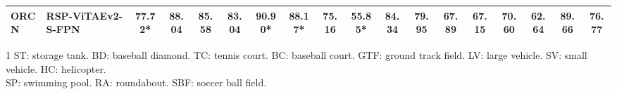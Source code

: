 \documentclass[10pt, journal,twoside]{IEEEtran}
\begin{document}
\begin{table*}[ht]
\begin{threeparttable}
{\begin{tabular}{l|l|c|c|c|c|c|c|c|c|c|c|c|c|c|c|c|c}
  ORCN & RSP-ViTAEv2-S-FPN & \bfseries 77.72\textbf{*} & 88.04 & 85.58 & 83.04 & 90.90\textbf{*} & \bfseries 88.17\textbf{*} & 75.16 & \bfseries 55.85\textbf{*} & 84.34 & 79.95 & \bfseries 67.89 & \bfseries 67.15 & 70.60 & \bfseries 62.64 & \bfseries 89.66 & 76.77 \\
  \hline
\end{tabular}
  }
  \begin{tablenotes}
    \scriptsize
    \item[1] ST: storage tank. BD: baseball diamond. TC: tennis court. BC: baseball court. GTF: ground track field. LV: large vehicle. SV: small vehicle. HC: helicopter.\\ SP: swimming pool. RA: roundabout. SBF: soccer ball field.
  \end{tablenotes}
  \end{threeparttable}
  \label{det_dota}
\end{table*}
\end{document}

